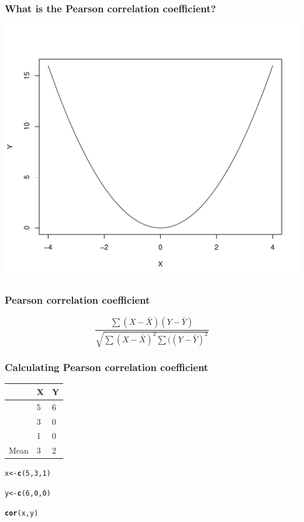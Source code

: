 \documentclass[dvipsnames]{beamer}\usepackage[]{graphicx}\usepackage[]{color}
\makeatletter
\def\maxwidth{ %
  \ifdim\Gin@nat@width>\linewidth
    \linewidth
  \else
    \Gin@nat@width
  \fi
}
\newcommand{\hlnum}[1]{\textcolor[rgb]{0.686,0.059,0.569}{#1}}%
\newcommand{\hlstd}[1]{\textcolor[rgb]{0.345,0.345,0.345}{#1}}%
\newcommand{\hlkwb}[1]{\textcolor[rgb]{0.69,0.353,0.396}{#1}}%
\newcommand{\hlkwd}[1]{\textcolor[rgb]{0.737,0.353,0.396}{\textbf{#1}}}%
\newenvironment{kframe}{%
 \def\at@end@of@kframe{}%
 \ifinner\ifhmode%
  \def\at@end@of@kframe{\end{minipage}}%
  \begin{minipage}{\columnwidth}%
 \fi\fi%
 \def\FrameCommand##1{\hskip\@totalleftmargin \hskip-\fboxsep
 \colorbox{shadecolor}{##1}\hskip-\fboxsep
     \hskip-\linewidth \hskip-\@totalleftmargin \hskip\columnwidth}%
 \MakeFramed {\advance\hsize-\width
   \@totalleftmargin\z@ \linewidth\hsize
   \@setminipage}}%
 {\par\unskip\endMakeFramed%
 \at@end@of@kframe}
\newenvironment{knitrout}{}{} %
\makeatother
\begin{document}
\begin{frame}
\frametitle{What is the Pearson correlation coefficient?}
\begin{knitrout}
\color{fgcolor}

{\centering \includegraphics[width=\maxwidth]{figure/unnamed-chunk-2-1} 

}



\end{knitrout}
\end{frame}

\begin{frame}
\frametitle{Pearson correlation coefficient}
$$
\frac{\sum(X - \bar{X})(Y - \bar{Y})}{\sqrt{\sum(X - \bar{X})^2\sum((Y - \bar{Y})^2}}
$$
\end{frame}

\begin{frame}
\frametitle{Calculating Pearson correlation coefficient}
\begin{center}
\begin{tabular}{lll}
\hline
&X	& Y \\
\hline
&5 &	6 \\
&3	&0 \\
&1	&0 \\
\hline
Mean &	3	&2 \\
\hline
\end{tabular}
\end{center}
\begin{knitrout}
\color{fgcolor}\begin{kframe}
\begin{alltt}
\hlstd{x} \hlkwb{<-} \hlkwd{c}\hlstd{(}\hlnum{5}\hlstd{,} \hlnum{3}\hlstd{,} \hlnum{1}\hlstd{)}

\hlstd{y} \hlkwb{<-} \hlkwd{c}\hlstd{(}\hlnum{6}\hlstd{,} \hlnum{0}\hlstd{,} \hlnum{0}\hlstd{)}

\hlkwd{cor}\hlstd{(x, y)}
\end{alltt}
\end{kframe}
\end{knitrout}
\end{frame}
\end{document}
